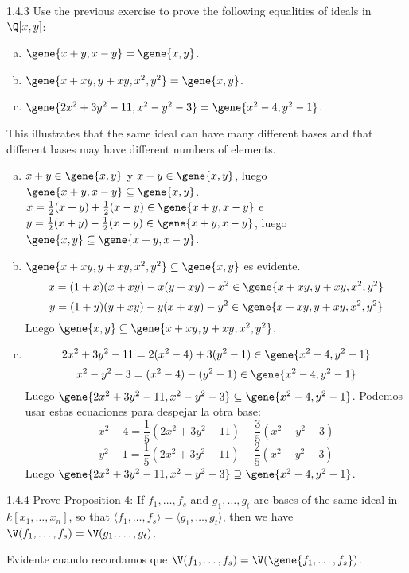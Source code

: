 \documentclass[twoside]{article}
\begin{document}
\newpage

\begin{ejercicio}{1.4.3}
Use the previous exercise to prove the following equalities of ideals in $\Q[x,y]$:
\begin{enumerate}[a.]
\item $\gene{x+y,x-y} = \gene{x,y}$.
\item $\gene{x+xy, y+xy, x^2, y^2} = \gene{x, y}$.
\item $\gene{2x^2+3y^2-11, x^2-y^2-3} = \gene{x^2-4, y^2-1}$.
\end{enumerate}
This illustrates that the same ideal can have many different bases and that different bases may have different numbers of elements.
\end{ejercicio}
\begin{solucion}\mbox{}
\begin{enumerate}[a.]
\item $x+y \in \gene{x,y}$ y $x-y \in \gene{x,y}$, luego $\gene{x+y,x-y} \subseteq \gene{x,y}$.
$x = \frac{1}{2} (x+y) + \frac{1}{2}  (x-y) \in \gene{x+y,x-y}$ e $y = \frac{1}{2} (x+y) - \frac{1}{2} (x-y) \in \gene{x+y, x-y}$, luego $\gene{x,y} \subseteq \gene{x+y,x-y}$.
\item $\gene{x+xy, y+xy, x^2, y^2} \subseteq \gene{x, y}$ es evidente.
\[ x = (1+x)(x + xy) - x(y+xy) - x^2 \in \gene{x+xy, y+xy, x^2, y^2} \]
\[ y = (1+y)(y + xy) - y(x+xy) - y^2 \in \gene{x+xy, y+xy, x^2, y^2} \]
Luego $\gene{x,y} \subseteq \gene{x+xy, y+xy, x^2, y^2}$.
\item 
\[ 2x^2+3y^2 - 11 = 2(x^2-4)+3(y^2-1) \in \gene{x^2-4, y^2-1} \]
\[ x^2-y^2-3 = (x^2-4) - (y^2-1) \in \gene{x^2-4, y^2-1} \]
Luego $\gene{2x^2+3y^2-11, x^2-y^2-3} \subseteq \gene{x^2-4, y^2-1}$.
Podemos usar estas ecuaciones para despejar la otra base:
\[ x^2-4 = \frac{1}{5} (2x^2+3y^2-11) - \frac{3}{5} (x^2-y^2-3) \]
\[ y^2-1 = \frac{1}{5}(2x^2+3y^2-11) - \frac{2}{5}(x^2-y^2-3) \]
Luego $\gene{2x^2+3y^2-11, x^2-y^2-3} \supseteq \gene{x^2-4, y^2-1}$.
\end{enumerate}
\end{solucion}

\newpage

\begin{ejercicio}{1.4.4}
Prove Proposition 4: If $f_1,\dots,f_s$ and $g_1,\dots,g_t$ are bases of the same ideal in $k[x_1,\dots,x_n]$, so that $\langle f_1,\dots,f_s\rangle = \langle g_1,\dots,g_t\rangle$, then we have $\V(f_1,\dots,f_s) = \V(g_1,\dots,g_t)$.
\end{ejercicio}
\begin{solucion}
Evidente cuando recordamos que $\V(f_1,\dots,f_s) = \V(\gene{f_1,\dots,f_s})$.
\end{solucion}
\end{document}
